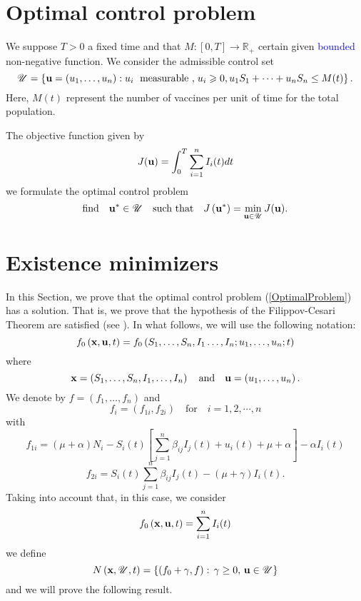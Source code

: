 \documentclass[a4paper,10pt]{article}
\theoremstyle{remark}
\begin{document}
\section{Optimal control problem}


We suppose $T>0$ a fixed time and that $ M:[0,T]\to\mathbb{R}_+$ certain given \textcolor{blue}{bounded} non-negative function. We consider the admissible control set
\[\mathscr{U}=\left\{\bold{u}=\left( u_{1}, \ldots,  u_{n}\right):  u_{i}\right.\text{ measurable }, \left. u_{i} \geqslant 0,  u_{1}S_{1}+\cdots+ u_{n}S_{n}\leq M(t)\right\}.\]
Here, $ M(t)$ represent the number of vaccines per unit of time for the total population.


The objective function given by
\[ J(\bold{u})=\int_{0}^{T} \sum_{i=1}^{n} I_{i}(t) d t\]
we formulate the optimal control problem 
\begin{equation}\label{OptimalProblem}
\text{find}\quad  \bold{u}^{*} \in \mathscr{U} \quad \text{such that}\quad 
          J\left(\bold{u}^{*}\right)=\min _{\bold{u}\in  \mathscr{U}} J(\bold{u}).
\end{equation}



\section{Existence minimizers}

In this Section, we prove that the optimal control problem (\ref{OptimalProblem}) has a solution. That is, we prove that the hypothesis of the Filippov-Cesari Theorem are satisfied (see \cite{A.Seierstad499}). In what follows, we will use the following notation:
\[f_{0}\left(\bold{x}, \bold{u}, t\right)=f_{0}\left(S_{1}, \ldots, S_{n}, I_{1}\ldots, I_n;  u_{1}, \ldots,  u_{n} ; t\right)\]
where
$$
\bold{x}=\left(S_{1}, \ldots, S_{n}, I_{1}, \ldots, I_{n}\right) \quad \text{and}\quad \bold{u}=\left(u_{1}, \ldots,  u_{n}\right).
$$
We denote by $f=\left(f_{1}, \ldots, f_{n}\right)$ and 
$$
f_{i}=\left(f_{1 i}, f_{2 i}\right)  \quad \text{for} \quad i=1,2,\cdots, n
$$
with
\[
f_{1 i}=(\mu+\alpha) N_i-S_{i}(t)\left[ \sum\limits_{j=1}^{n} \beta_{i j} I_{j}(t)+ u_{i}(t) +\mu+\alpha\right] -\alpha I_i(t)
\]
\[f_{2i}=S_{i}(t) \sum\limits_{j=1}^{n} \beta_{i j} I_{j}(t)-(\mu+\gamma) I_{i}(t).
\]
Taking into account that, in this case, we consider 
$$
f_{0}\left(\bold{x}, \bold{u}, t\right)=\sum_{i=1}^{n} I_{i}(t)
$$
we define
$$N\left(\bold{x}, \mathscr{U}, t\right)=\left\{\left(f_{0}+\gamma, f\right):\, \gamma \geq 0,\,  \bold{u} \in \mathscr{U}\right\}$$
and we will prove the following result.
\end{document}
